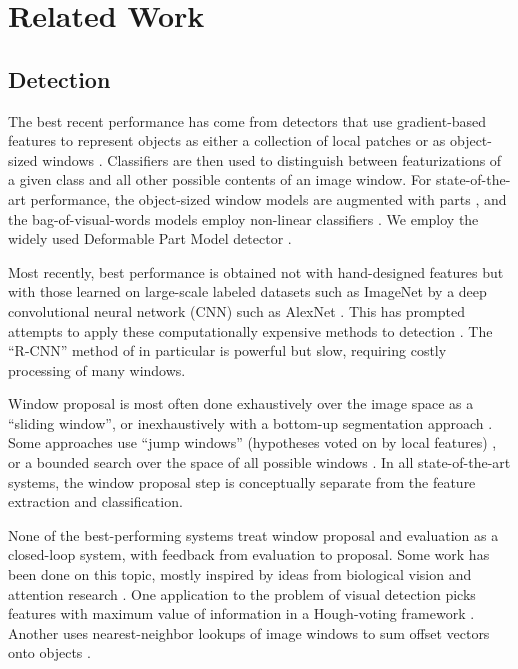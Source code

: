 \section{Related Work}\label{sec:related_work}

\subsection{Detection}

The best recent performance has come from detectors that use gradient-based features to represent objects as either a collection of local patches or as object-sized windows \parencite{Dalal2005,Lowe2004}.
Classifiers are then used to distinguish between featurizations of a given class and all other possible contents of an image window.
For state-of-the-art performance, the object-sized window models are augmented with parts \parencite{Felzenszwalb2010a}, and the bag-of-visual-words models employ non-linear classifiers \parencite{Vedaldi2009}.
We employ the widely used Deformable Part Model detector \parencite{Felzenszwalb2010a}.

Most recently, best performance is obtained not with hand-designed features but with those learned on large-scale labeled datasets such as ImageNet \parencite{Deng-CVPR-2009} by a deep convolutional neural network (CNN) such as AlexNet \parencite{Krizhevsky-NIPS-2012}.
This has prompted attempts to apply these computationally expensive methods to detection \parencite{Erhan-CVPR-2014,Sermanet-ICLR-2014} .
The ``R-CNN'' method of \cite{Girshick-CVPR-2014} in particular is powerful but slow, requiring costly processing of many windows.

Window proposal is most often done exhaustively over the image space as a ``sliding window'', or inexhaustively with a bottom-up segmentation approach \parencite{Uijlings-IJCV-2013}.
Some approaches use ``jump windows'' (hypotheses voted on by local features) \parencite{Vedaldi2009,Vijayanarasimhan2011}, or a bounded search over the space of all possible windows \parencite{Lampert2008a}.
In all state-of-the-art systems, the window proposal step is conceptually separate from the feature extraction and classification.

None of the best-performing systems treat window proposal and evaluation as a closed-loop system, with feedback from evaluation to proposal.
Some work has been done on this topic, mostly inspired by ideas from biological vision and attention research \parencite{Butko2009,Vogel2008}.
One application to the problem of visual detection picks features with maximum value of information in a Hough-voting framework \parencite{Vijayanarasimhan2010}.
Another uses nearest-neighbor lookups of image windows to sum offset vectors onto objects \parencite{Alexe2012a}.

